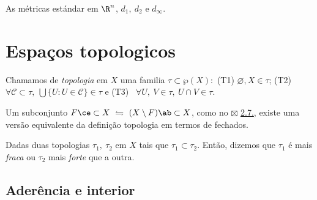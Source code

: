 \begin{example}
    As métricas estándar em \(\R^n\), \(d_1, \ d_2\) e \( d_\infty\).  
\end{example}

\section{Espaços topologicos}

\begin{definition}
    Chamamos de \emph{topologia} em \(X\) uma familia \(\tau \subset \wp(X) :\) (T1) \(\varnothing, X \in \tau\); (T2) \(\forall \mathcal{C} \subset \tau, \ \bigcup \{U : U \in \mathcal{C}\} \in \tau\) e (T3) \ \(\forall U, \ V \in \tau, \ U\cap V \in \tau \). 
\end{definition}

\begin{note}
    Um subconjunto \(F\ce\subset X \ \leftrightharpoons \ (X \setminus F)\ab \subset X\), como no {\scriptsize \(\boxtimes\)} \hyperlink{coro27}{2.7.}, existe uma versão equivalente da definição topologia em termos de fechados.
\end{note}

\begin{definition}
    Dadas duas topologias \(\tau_1, \ \tau_2 \) em \(X\) tais que \(\tau_1\subset \tau_2\). Então, dizemos que \(\tau_1\) é mais \emph{fraca} ou \(\tau_2\) mais \emph{forte}  que a outra.  
\end{definition}


\subsection*{Aderência e interior}

